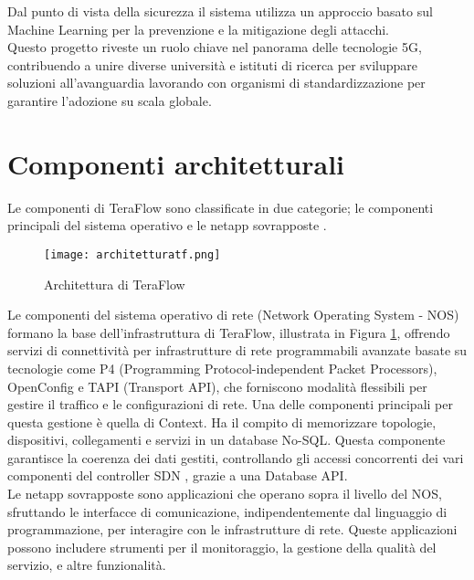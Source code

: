Dal punto di vista della sicurezza il sistema utilizza un approccio basato sul Machine Learning per la prevenzione e la mitigazione degli attacchi.
\\Questo progetto riveste un ruolo chiave nel panorama delle tecnologie 5G, contribuendo a unire diverse università e istituti di ricerca per sviluppare soluzioni all'avanguardia
lavorando con organismi di standardizzazione per garantire l'adozione su scala globale.
\section{Componenti architetturali}
Le componenti di TeraFlow sono classificate in due categorie; le componenti principali del sistema operativo e le netapp sovrapposte \cite{Component}. 
\begin{figure}[h]
    \centering
   \texttt{[image: architetturatf.png]}
    \caption{Architettura di TeraFlow \cite{archtfs}}
    \label{fig:tfs}
\end{figure}
Le componenti del sistema operativo di rete (Network Operating System - NOS) formano la base dell'infrastruttura di TeraFlow, illustrata in Figura \ref{fig:tfs}, offrendo servizi di connettività per infrastrutture di rete programmabili avanzate \cite{Component} %
basate su tecnologie come P4 (Programming Protocol-independent Packet Processors), OpenConfig e TAPI (Transport API), che forniscono modalità flessibili per gestire il traffico e le configurazioni di rete.
Una delle componenti principali per questa gestione è quella di Context. Ha il compito di memorizzare topologie, dispositivi, 
collegamenti e servizi in un database No-SQL\cite{D31}. 
Questa componente garantisce la coerenza dei dati gestiti, controllando gli accessi concorrenti dei vari componenti del controller SDN \cite{arttfs},
grazie a una Database API.
\\Le netapp sovrapposte sono applicazioni che operano sopra il livello del NOS, sfruttando le interfacce di comunicazione, indipendentemente dal linguaggio di programmazione, per interagire con le infrastrutture di rete.
Queste applicazioni possono includere strumenti per il monitoraggio, la gestione della qualità del servizio, e altre funzionalità.
